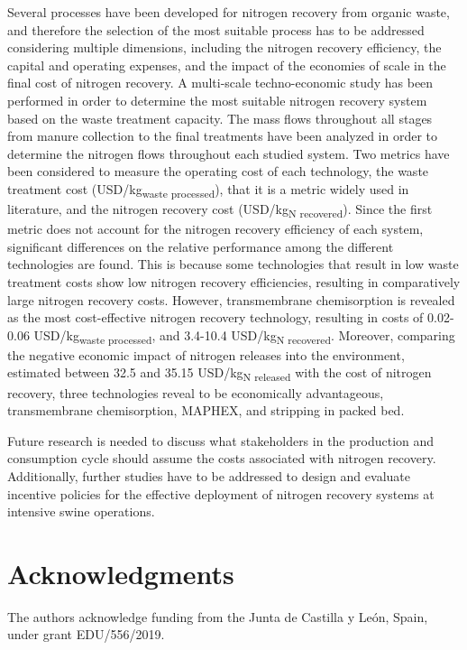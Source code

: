 \begin{refsection}[referencesCh6]
Several processes have been developed for nitrogen recovery from organic waste, and therefore the selection of the most suitable process has to be addressed considering multiple dimensions, including the nitrogen recovery efficiency, the capital and operating expenses, and the impact of the economies of scale in the final cost of nitrogen recovery. A multi-scale techno-economic study has been performed in order to determine the most suitable nitrogen recovery system based on the waste treatment capacity.
The mass flows throughout all stages from manure collection to the final treatments have been analyzed in order to determine the nitrogen flows throughout each studied system.
Two metrics have been considered to measure the operating cost of each technology, the waste treatment cost (USD/kg\textsubscript{waste processed}), that it is a metric widely used in literature, and the nitrogen recovery cost (USD/kg\textsubscript{N recovered}). Since the first metric does not account for the nitrogen recovery efficiency of each system, significant differences on the relative performance among the different technologies are found. This is because some technologies that result in low waste treatment costs show low nitrogen recovery efficiencies, resulting in comparatively large nitrogen recovery costs. However, transmembrane chemisorption is revealed as the most cost-effective nitrogen recovery technology, resulting in costs of 0.02-0.06 USD/kg\textsubscript{waste processed}, and 3.4-10.4 USD/kg\textsubscript{N recovered}. Moreover, comparing the negative economic impact of nitrogen releases into the environment, estimated between 32.5 and 35.15 USD/kg\textsubscript{N released} with the cost of nitrogen recovery, three technologies reveal to be economically advantageous, transmembrane chemisorption, MAPHEX, and stripping in packed bed.

Future research is needed to discuss what stakeholders in the production and consumption cycle should assume the costs associated with nitrogen recovery. Additionally, further studies have to be addressed to design and evaluate incentive policies for the effective deployment of nitrogen recovery systems at intensive swine operations.

\section*{Acknowledgments} \label{section:Acknowledgments}
The authors acknowledge funding from the Junta de Castilla y Le\'{o}n, Spain, under grant
EDU/556/2019.


\end{refsection}
